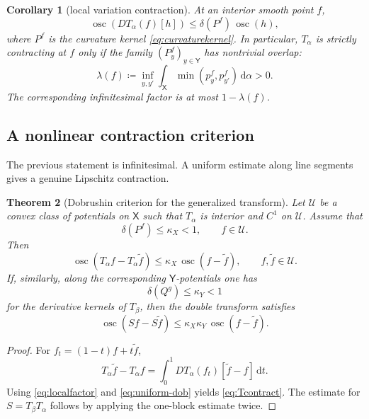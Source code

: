 \documentclass[11pt]{article}
\newtheorem{theorem}{Theorem}[section]
\newtheorem{corollary}[theorem]{Corollary}
\newcommand{\X}{\mathsf{X}}
\newcommand{\Y}{\mathsf{Y}}
\newcommand{\dd}{\,\mathrm{d}}
\newcommand{\osc}{\operatorname{osc}}
\newcommand{\defeq}{\coloneqq}
\begin{document}
\begin{corollary}[local variation contraction]\label{cor:local}
At an interior smooth point $f$,
\begin{equation}\label{eq:localfactor}
  \osc(DT_\alpha(f)[h])
  \leq \delta(P^f)\,\osc(h),
\end{equation}
where $P^f$ is the curvature kernel \eqref{eq:curvaturekernel}.  In particular,
$T_\alpha$ is strictly contracting at $f$ only if the family
$(P_y^f)_{y\in\Y}$ has nontrivial overlap:
\begin{equation}\label{eq:overlap}
  \lambda(f)
  \defeq
  \inf_{y,y'}\int_\X \min(p_y^f,p_{y'}^f)\dd\alpha>0.
\end{equation}
The corresponding infinitesimal factor is at most $1-\lambda(f)$.
\end{corollary}

\subsection{A nonlinear contraction criterion}

The previous statement is infinitesimal.  A uniform estimate along line
segments gives a genuine Lipschitz contraction.

\begin{theorem}[Dobrushin criterion for the generalized transform]\label{thm:dobrushin}
Let $\mathcal{U}$ be a convex class of potentials on $\X$ such that
$T_\alpha$ is interior and $C^1$ on $\mathcal{U}$.  Assume that
\begin{equation}\label{eq:uniform-dob}
  \delta(P^f)\leq \kappa_X<1,
  \qquad f\in\mathcal{U}.
\end{equation}
Then
\begin{equation}\label{eq:Tcontract}
  \osc(T_\alpha f-T_\alpha \tilde f)
  \leq \kappa_X\,\osc(f-\tilde f),
  \qquad f,\tilde f\in\mathcal{U}.
\end{equation}
If, similarly, along the corresponding $\Y$-potentials one has
\begin{equation*}
  \delta(Q^g)\leq \kappa_Y<1
\end{equation*}
for the derivative kernels of $T_\beta$, then the double transform satisfies
\begin{equation}\label{eq:Scontract}
  \osc(Sf-S\tilde f)
  \leq \kappa_X\kappa_Y\,\osc(f-\tilde f).
\end{equation}
\end{theorem}

\begin{proof}
For $f_t=(1-t)f+t\tilde f$,
\begin{equation*}
  T_\alpha\tilde f-T_\alpha f
  =\int_0^1 DT_\alpha(f_t)[\tilde f-f]\dd t.
\end{equation*}
Using \eqref{eq:localfactor} and \eqref{eq:uniform-dob} yields
\eqref{eq:Tcontract}.  The estimate for $S=T_\beta T_\alpha$ follows by applying
the one-block estimate twice.
\end{proof}
\end{document}
